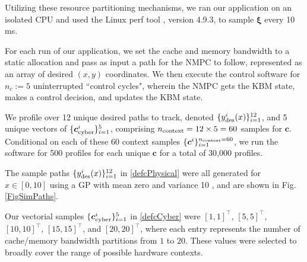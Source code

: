 \documentclass[letterpaper, 10pt, twocolumn]{ieeeconf}      %
\begin{document}

Utilizing these resource partitioning mechanisms, we ran our application on an isolated CPU and used the Linux perf tool \cite{perf}, version 4.9.3, to sample $\bm{\xi}$ every 10 ms.

For each run of our application, we set the cache and memory bandwidth to a static allocation and pass as input a path for the NMPC to follow, represented as an array of desired $(x,y)$ coordinates.
We then execute the control software for $n_c:=5$ uninterrupted ``control cycles", wherein the NMPC gets the KBM state, makes a control decision, and updates the KBM state.



We profile over 12 unique desired paths to track, denoted $\{y_{\rm{des}}^{i}(x)\}_{i=1}^{12}$, and 5 unique vectors of $\{\bm{c}_{\rm{cyber}}^{i}\}_{i=1}^{5}$, comprising $n_{\rm{context}} = 12 \times 5 = 60$ samples for $\bm{c}$. Conditional on each of these $60$ context samples $\{\bm{c}^{i}\}_{i=1}^{n_{\rm{context}}=60}$, we run the software for 500 profiles for each unique $\bm{c}$ for a total of 30,000 profiles.

The sample paths $\{y_{\rm{des}}^{i}(x)\}_{i=1}^{12}$ in \eqref{defcPhysical} were all generated for $x\in[0,10]$ using a GP with mean zero and variance 10 \cite{scikit-learn}, and are shown in Fig. \ref{FigSimPaths}.

Our vectorial samples $\{\bm{c}_{\rm{cyber}}^{i}\}_{i=1}^{5}$ in \eqref{defcCyber} were $[1,1]^\top$, $[5,5]^\top$, $[10,10]^\top$, $[15,15]^\top$, and $[20,20]^\top$, where each entry represents the number of cache/memory bandwidth partitions from $1$ to $20$. These values were selected to broadly cover the range of possible hardware contexts.
\end{document}
